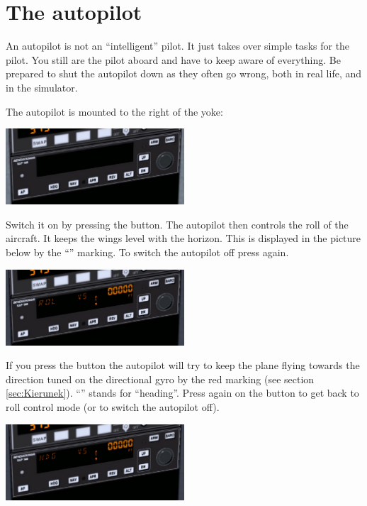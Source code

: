 \section{The autopilot}
\label{sec:Autopilot}

An autopilot is not an ``intelligent'' pilot. It just takes over simple tasks
for the pilot. You still are the pilot aboard and have to keep aware of
everything. Be prepared to shut the autopilot down as they often go wrong,
both in real life, and in the simulator.

The autopilot is mounted to the right of the yoke:

\begin{center}
\includegraphics[width=0.5\textwidth]{img/tut_49}
\end{center}

Switch it on by pressing the  button.
The autopilot then controls the roll of the aircraft. It keeps the wings level with the horizon. This is
displayed in the picture below by the ``\textcolor{orange}{}''
marking. To switch the autopilot off press  again.

\begin{center}
\includegraphics[width=0.5\textwidth]{img/tut_50}
\end{center}

 If you press the  button the autopilot will try to keep
the plane flying towards the direction tuned on the directional gyro by
the red marking (see section \ref{sec:Kierunek}).
``\textcolor{orange}{}'' stands for ``heading''. Press
again on the  button to get back to roll control mode (or
 to switch the autopilot off).

\begin{center}
\includegraphics[width=0.5\textwidth]{img/tut_51}
\end{center}

